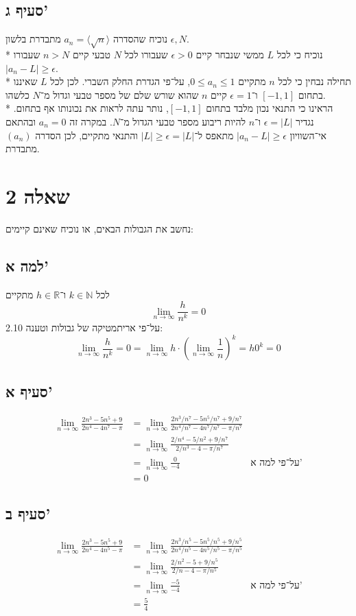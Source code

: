 \documentclass[a4paper]{article}
\def\NN{\mathbb{N}}
\def\RR{\mathbb{R}}
\begin{document}
\subsection{סעיף ג'}
נוכיח שהסדרה $a_n = \langle \sqrt{n} \rangle$ מתבדרת בלשון $\epsilon, N$. \\*
נוכיח כי לכל $L$ ממשי שנבחר קיים $\epsilon > 0$ שעבורו לכל $N$
טבעי קיים $n > N$ שעבורו $\left| a_n - L \right| \ge \epsilon$. \\*
תחילה נבחין כי לכל $n$ מתקיים $0 \le a_n \le 1$, על־פי הגדרת החלק השברי.
לכן לכל $L$ שאיננו בתחום $[-1, 1]$ ו־$\epsilon = 1$
קיים $n$ שהוא שורש שלם של מספר טבעי וגדול מ־$N$ כלשהו. \\*
הראינו כי התנאי נכון מלבד בתחום $[-1, 1]$, נותר עתה לראות את נכונותו אף בתחום.
נגדיר $\epsilon = \left| L \right|$ ו־$n$ להיות ריבוע מספר טבעי הגדול מ־$N$.
במקרה זה $a_n = 0$ ובהתאם אי־השוויון $\left| a_n - L \right| \ge \epsilon$
מתאפס ל־$\left| L \right| \ge \epsilon = \left| L \right|$ והתנאי מתקיים,
לכן הסדרה $(a_n)$ מתבדרת.

\section{שאלה 2}
נחשב את הגבולות הבאים, או נוכיח שאינם קיימים:

\subsection{למה א'}
לכל $k \in \NN$ ו־$h \in \RR$ מתקיים
\[
	\lim_{n \to \infty} \frac{h}{n^k} = 0
\]
על־פי אריתמטיקה של גבולות וטענה 2.10:
\[
	\lim_{n \to \infty} \frac{h}{n^k} = 0
	= \lim_{n \to \infty} h \cdot
	{\left(\lim_{n \to \infty} \frac{1}{n}\right)}^k
	= h {0}^k
	= 0
\]

\subsection{סעיף א'}
\begin{align*}
	\lim_{n \to \infty} \frac{2n^3 - 5n^5 + 9}{2n^4 - 4n^7 - \pi}
	& = \lim_{n \to \infty} \frac{2n^3/n^7 - 5n^5/n^7 + 9/n^7}
	{2n^4/n^7 - 4n^7/n^7 - \pi/n^7} \\
	& = \lim_{n \to \infty} \frac{2/n^4 - 5/n^2 + 9/n^7}
	{2/n^3 - 4 - \pi/n^7} \\
	& = \lim_{n \to \infty} \frac{0}
	{-4} & \text{על־פי למה א'} \\
	& = 0
\end{align*}

\subsection{סעיף ב'}
\begin{align*}
	\lim_{n \to \infty} \frac{2n^3 - 5n^5 + 9}{2n^4 - 4n^5 - \pi}
	& = \lim_{n \to \infty} \frac{2n^3/n^5 - 5n^5/n^5 + 9/n^5}
	{2n^4/n^5 - 4n^5/n^5 - \pi/n^5} \\
	& = \lim_{n \to \infty} \frac{2/n^2 - 5 + 9/n^5}
	{2/n - 4 - \pi/n^5} \\
	& = \lim_{n \to \infty} \frac{-5}
	{-4} & \text{על־פי למה א'} \\
	& = \frac{5}{4}
\end{align*}
\end{document}
